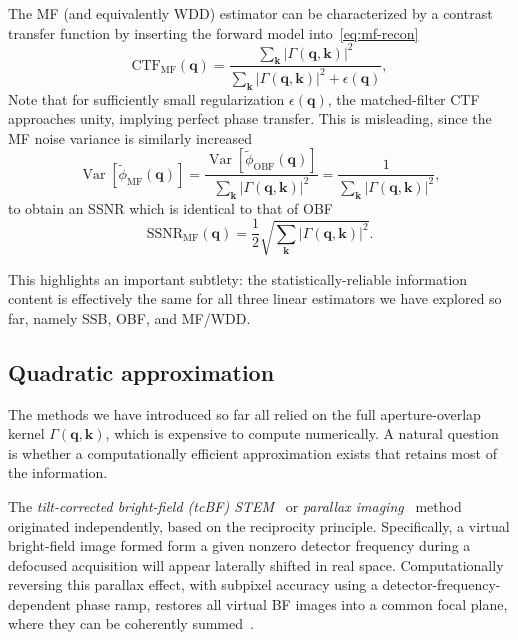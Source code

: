 \documentclass[pdflatex,sn-aps,iicol]{sn-jnl}%
\begin{document}
The MF (and equivalently WDD) estimator can be characterized by a contrast transfer function by inserting the forward model into~\cref{eq:mf-recon}
\begin{equation}
\mathrm{CTF}_{\text{MF}}(\boldsymbol{q})
=
\frac{\sum_{\boldsymbol{k}}\lvert \Gamma(\boldsymbol{q},\boldsymbol{k}) \rvert^2}
{\sum_{\boldsymbol{k}}\lvert \Gamma(\boldsymbol{q},\boldsymbol{k}) \rvert^2+\epsilon(\boldsymbol{q})},
\label{eq:mf-ctf}
\end{equation}
Note that for sufficiently small regularization $\epsilon(\boldsymbol{q})$, the matched-filter CTF approaches unity, implying perfect phase transfer.
This is misleading, since the MF noise variance is similarly increased
\begin{equation}
\operatorname{Var}\!\left[\tilde{\phi}_{\text{MF}}(\boldsymbol{q})\right]
=
\frac{\operatorname{Var}\!\left[\tilde{\phi}_{\text{OBF}}(\boldsymbol{q})\right]}{\sum_{\boldsymbol{k}}\lvert \Gamma(\boldsymbol{q},\boldsymbol{k}) \rvert^2}
=
\frac{1}{\sum_{\boldsymbol{k}}\lvert \Gamma(\boldsymbol{q},\boldsymbol{k}) \rvert^2},
\label{eq:mf-var}
\end{equation}
to obtain an SSNR which is identical to that of OBF
\begin{equation}
\mathrm{SSNR}_{\text{MF}}(\boldsymbol{q})
=
\frac{1}{2}
\sqrt{\sum_{\boldsymbol{k}}\lvert \Gamma(\boldsymbol{q},\boldsymbol{k}) \rvert^2}.
\label{eq:mf-ssnr}
\end{equation}

This highlights an important subtlety: the statistically-reliable information content is effectively the same for all three linear estimators we have explored so far, namely SSB, OBF, and MF/WDD.

\subsection*{Quadratic approximation} \label{sec:parallax}

The methods we have introduced so far all relied on the full aperture-overlap kernel $\Gamma(\boldsymbol{q},\boldsymbol{k})$, which is expensive to compute numerically.
A natural question is whether a computationally efficient approximation exists that retains most of the information.

The \emph{tilt-corrected bright-field (tcBF) STEM}~\cite{Nguyen_2016,Spoth_2017,Yu_2025} or \emph{parallax imaging}~\cite{Varnavides_2023,Varnavides_2024,Varnavides_2025} method originated independently, based on the reciprocity principle.
Specifically, a virtual bright-field image formed form a given nonzero detector frequency during a defocused acquisition will appear laterally shifted in real space.
Computationally reversing this parallax effect, with subpixel accuracy using a detector-frequency-dependent phase ramp, restores all virtual BF images into a common focal plane, where they can be coherently summed~\cite{Yu_2025,Varnavides_2025}.
\end{document}
